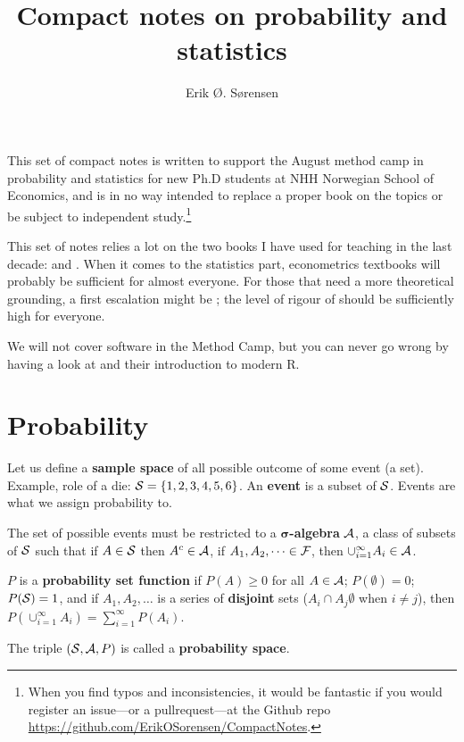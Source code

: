 \documentclass[twoside]{article}
\title{Compact notes on probability and statistics}
\author{Erik Ø. Sørensen}
\begin{document}
\maketitle
\sloppy
\frenchspacing



\tableofcontents

\newpage
\noindent This set of compact notes is written to support the August method camp
in probability and statistics for new Ph.D students at NHH Norwegian School of
Economics, and is in no way intended to replace a proper book on the topics or
be subject to independent study.\footnote{When you find typos and inconsistencies,
it would be fantastic if you would register an issue---or a pullrequest---at the
Github repo \url{https://github.com/ErikOSorensen/CompactNotes}.}

This set of notes relies a lot on the two books
I have used for teaching in the last decade: \citet{Hogg2013} and
\citet{Linton2017}. When it comes to the statistics part, econometrics textbooks
will probably be sufficient for almost everyone. For those that need a more
theoretical grounding, a first escalation might be \citet{Rosenthal2006}; the
level of rigour of \citet{Billingsley1995} should be sufficiently high for
everyone.


We will not cover software in the Method Camp, but you can never go wrong by
having a look at \citet{Wickham2017} and their introduction to modern R.


\section{Probability}
Let us define a \textbf{sample space} of all possible outcome of some
event (a set). Example, role of a die: $\mathcal{S} =\{1,2,3,4,5,6\}$. 
An \textbf{event} is a subset of $\mathcal{S}$. Events are what we assign probability
to.

The set of possible events must be restricted to a $\mathbf{\sigma}$\textbf{-algebra} $\mathcal{A}$,
a class of subsets of $\mathcal{S}$ such that if $A\in\mathcal{S}$ then $A^c\in\mathcal{A}$, if $A_1,A_2,\dots\in \mathcal{F}$,
then $\cup_{i=1}^\infty A_i \in \mathcal{A}$. 

$P$ is a \textbf{probability set function} if $P(A)\geq0$ for all $A\in\mathcal{A}$; $P(\emptyset)=0$; $P(\mathcal{S})=1$,
and if $A_1,A_2,\dots$ is a series of \textbf{disjoint} sets ($A_i\cap A_j\emptyset$ when $i\neq j$), then
$P(\cup_{i=1}^\infty A_i)=\sum_{i=1}^\infty P(A_i)$.


The triple $(\mathcal{S},\mathcal{A},P)$ is called a \textbf{probability space}.
\end{document}
